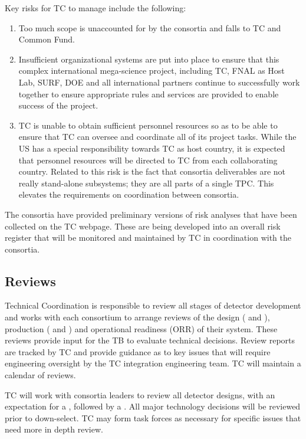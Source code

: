 Key risks for TC to manage include the following:
\begin{enumerate}
    \item Too much scope is unaccounted for by the consortia and falls
      to TC and Common Fund.
    \item Insufficient organizational systems are put into place to
      ensure that this complex international mega-science project,
      including TC, FNAL as Host Lab, SURF, DOE and all international
      partners continue to successfully work together to ensure
      appropriate rules and services are provided to enable success of
      the project.
  \item TC is unable to obtain sufficient personnel resources so as to
    be able to ensure that TC can oversee and coordinate all of its
    project tasks.  While the US has a special responsibility towards
    TC as host country, it is expected that personnel resources will
    be directed to TC from each collaborating country. Related to this
    risk is the fact that consortia deliverables are not really
    stand-alone subsystems; they are all parts of a single TPC. This
    elevates the requirements on coordination between consortia.
\end{enumerate}

The consortia have provided preliminary versions of risk analyses that
have been collected on the TC webpage. These are being developed into
an overall risk register that will be monitored and maintained by TC
in coordination with the consortia.

\subsection{Reviews}
\label{sec:fdsp-coord-reviews}

Technical Coordination is responsible to review all stages of detector
development and works with each consortium to arrange reviews of the
design ( and ), production ( and
) and operational readiness (ORR) of their system.  These
reviews provide input for the TB to evaluate technical decisions.
Review reports are tracked by TC and provide guidance as to key issues
that will require engineering oversight by the TC integration
engineering team. TC will maintain a calendar of  reviews.

TC will work with consortia leaders to review all detector designs,
with an expectation for a , followed by a .  All
major technology decisions will be reviewed prior to down-select.  TC
may form task forces as necessary for specific issues that need more
in depth review.


